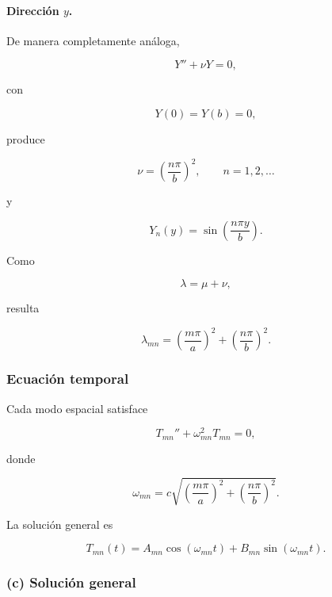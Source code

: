 \documentclass[12pt]{article}
\begin{document}
\paragraph{Dirección $y$.}

De manera completamente análoga,

\[
Y''+\nu Y=0,
\]

con

\[
Y(0)=Y(b)=0,
\]

produce

\begin{equation}
\nu
=
\left(\frac{n\pi}{b}\right)^2,
\qquad
n=1,2,\ldots
\end{equation}

y

\begin{equation}
Y_n(y)
=
\sin\!\left(\frac{n\pi y}{b}\right).
\end{equation}

Como

\[
\lambda=\mu+\nu,
\]

resulta

\begin{equation}
\lambda_{mn}
=
\left(\frac{m\pi}{a}\right)^2
+
\left(\frac{n\pi}{b}\right)^2.
\end{equation}

\subsubsection*{Ecuación temporal}

Cada modo espacial satisface

\begin{equation}
T_{mn}''
+
\omega_{mn}^2T_{mn}=0,
\end{equation}

donde

\begin{equation}
\omega_{mn}
=
c
\sqrt{
\left(\frac{m\pi}{a}\right)^2
+
\left(\frac{n\pi}{b}\right)^2
}.
\end{equation}

La solución general es

\begin{equation}
T_{mn}(t)
=
A_{mn}\cos(\omega_{mn}t)
+
B_{mn}\sin(\omega_{mn}t).
\end{equation}

\subsubsection*{(c) Solución general}
\end{document}
